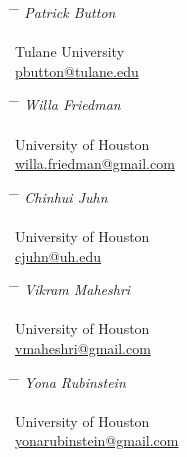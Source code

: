 \documentclass[letterpaper]{article}
\begin{document}
\parbox{0.5\textwidth}{
\begin{tabbing}
\hspace{2.75cm} \= \hspace{4cm} \= \kill
{\textit{Patrick Button }}  \\\\
{Tulane University}\\ 
{\href{mailto:pbutton@tulane.edu}{pbutton@tulane.edu}}
\end{tabbing}}
\hfill
\parbox{0.5\textwidth}{
\begin{tabbing}
\hspace{2.75cm} \= \hspace{4cm} \= \kill
{\textit{Willa Friedman }} \\\\
{University of Houston}\\ 
{\href{mailto:willa.friedman@gmail.com}{willa.friedman@gmail.com}}
\end{tabbing}}
\hfill
\parbox{0.5\textwidth}{ 
\begin{tabbing}
\hspace{2.75cm} \= \hspace{4cm} \= \kill
{\textit{Chinhui Juhn }} \\\\
{University of Houston}\\ 
{\href{mailto:cjuhn@uh.edu}{cjuhn@uh.edu}}
\end{tabbing}}
\hfill
\parbox{0.5\textwidth}{ 
\begin{tabbing}
\hspace{2.75cm} \= \hspace{4cm} \= \kill
{\textit{Vikram Maheshri} } \\\\
{University of Houston}\\ 
{\href{mailto:vmaheshri@gmail.com}{vmaheshri@gmail.com}}
\end{tabbing}}
\hfill
\parbox{0.5\textwidth}{ 
\begin{tabbing}
\hspace{2.75cm} \= \hspace{4cm} \= \kill
{\textit{Yona Rubinstein} } \\\\
{University of Houston}\\ 
{\href{mailto:yonarubinstein@gmail.com}{yonarubinstein@gmail.com}}
\end{tabbing}}
\end{document}
